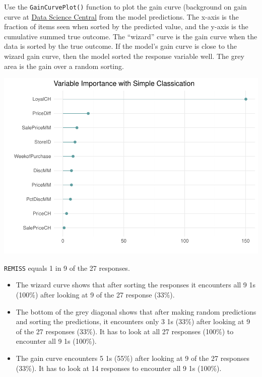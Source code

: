\documentclass[
]{book}
\newenvironment{Shaded}{\begin{snugshade}}{\end{snugshade}}
\newcommand{\DataTypeTok}[1]{\textcolor[rgb]{0.13,0.29,0.53}{#1}}
\newcommand{\KeywordTok}[1]{\textcolor[rgb]{0.13,0.29,0.53}{\textbf{#1}}}
\newcommand{\NormalTok}[1]{#1}
\newcommand{\OperatorTok}[1]{\textcolor[rgb]{0.81,0.36,0.00}{\textbf{#1}}}
\newcommand{\StringTok}[1]{\textcolor[rgb]{0.31,0.60,0.02}{#1}}
\providecommand{\tightlist}{%
  \setlength{\itemsep}{0pt}\setlength{\parskip}{0pt}}
\begin{document}
Use the \texttt{GainCurvePlot()} function to plot the gain curve (background on gain curve at \href{https://www.datasciencecentral.com/profiles/blogs/understanding-and-interpreting-gain-and-lift-charts}{Data Science Central} from the model predictions. The x-axis is the fraction of items seen when sorted by the predicted value, and the y-axis is the cumulative summed true outcome. The ``wizard'' curve is the gain curve when the data is sorted by the true outcome. If the model's gain curve is close to the wizard gain curve, then the model sorted the response variable well. The grey area is the gain over a random sorting.

\begin{Shaded}
\end{Shaded}

\includegraphics{data-sci_files/figure-latex/unnamed-chunk-34-1.pdf}

\texttt{REMISS} equals 1 in 9 of the 27 responses.

\begin{itemize}
\tightlist
\item
  The wizard curve shows that after sorting the responses it encounters all 9 1s (100\%) after looking at 9 of the 27 response (33\%).\\
\item
  The bottom of the grey diagonal shows that after making random predictions and sorting the predictions, it encounters only 3 1s (33\%) after looking at 9 of the 27 responses (33\%). It has to look at all 27 responses (100\%) to encounter all 9 1s (100\%).\\
\item
  The gain curve encounters 5 1s (55\%) after looking at 9 of the 27 responses (33\%). It has to look at 14 responses to encounter all 9 1s (100\%).
\end{itemize}
\end{document}

